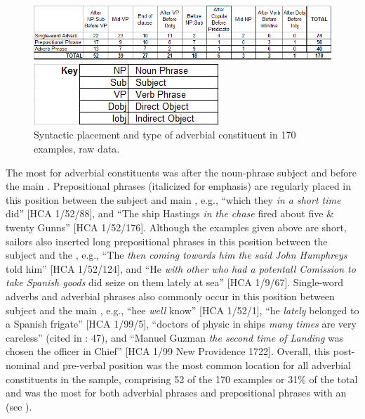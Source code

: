  
\begin{figure}  
\includegraphics[width=\textwidth]{figures/delgado-img18.png}
 
\includegraphics[width=\textwidth]{figures/delgado-img19.png}
\caption{\label{tab:key:7.1} Syntactic placement and type of adverbial constituent in 170 examples, raw data.}
\end{figure}


The most  for adverbial constituents was after the noun-phrase subject and before the main . Prepositional phrases (italicized for emphasis) are regularly placed in this position between the subject and main , e.g., “which they \textit{in a short time} did” [HCA 1/52/88], and “The ship Hastings \textit{in the chase} fired about five \& twenty Gunns” [HCA 1/52/176]. Although the examples given above are short, sailors also inserted long prepositional phrases in this position between the subject and the , e.g., “The  \textit{then coming towards him the said John Humphreys} told him” [HCA 1/52/124], and “He \textit{with other who had a potentall Comission to take Spanish goods} did seize on them lately at sea” [HCA 1/9/67]. Single-word adverbs and adverbial phrases also commonly occur in this position between subject and the main , e.g., “hee \textit{well} know” [HCA 1/52/1], “he \textit{lately} belonged to a Spanish frigate” [HCA 1/99/5], “doctors of physic in ships \textit{many times} are very careless” (cited in \citealt{Brown2011}: 47), and “Manuel Guzman \textit{the second time of Landing} was chosen the officer in Chief” [HCA 1/99 New Providence 1722]. Overall, this post-nominal and pre-verbal position was the most common location for all adverbial constituents in the sample, comprising 52 of the 170 examples or 31\% of the total and was the most  for both adverbial phrases and prepositional phrases with an  (see ). 

